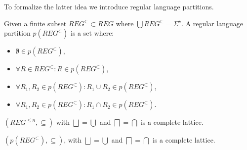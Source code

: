 To formalize the latter idea we introduce regular language partitions.

\begin{definition}
    Given a finite subset $REG^\subset \subset REG$ where $\bigcup REG^\subset = \Sigma^\star$.
    A regular language partition $p(REG^\subset)$ is a set where:
    \begin{itemize}
        \item $\emptyset \in p(REG^\subset)$,
        \item $\forall R \in REG^\subset : R \in p(REG^\subset)$,
        \item $\forall R_1, R_2 \in p(REG^\subset) : R_1 \cup R_2 \in p(REG^\subset)$,
        \item $\forall R_1, R_2 \in p(REG^\subset) : R_1 \cap R_2 \in p(REG^\subset)$.
    \end{itemize}
\end{definition}

\begin{theorem}\label{thm:finite-reg-lattice}
    $(REG^{\leq n}, \subseteq)$ with $\bigsqcup = \bigcup$ and $\bigsqcap = \bigcap$ is a complete lattice.
\end{theorem}

\begin{theorem}\label{thm:reg-partition-lattice}
    $(p(REG^\subset), \subseteq)$, with $\bigsqcup = \bigcup$ and $\bigsqcap = \bigcap$ is a complete lattice.
\end{theorem}
